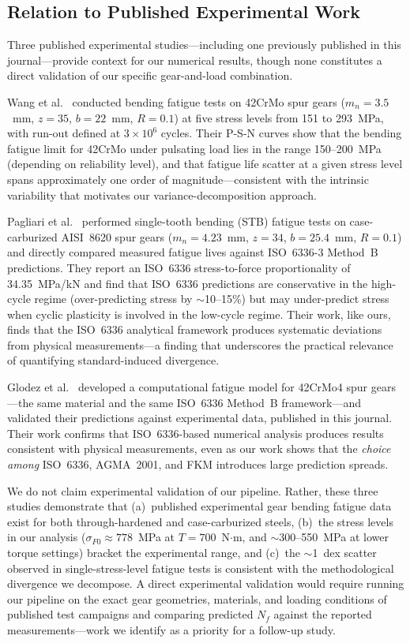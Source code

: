 \documentclass[12pt,a4paper]{article}
\begin{document}
\subsection{Relation to Published Experimental Work}

Three published experimental studies---including one previously
published in this journal---provide context for our numerical
results, though none constitutes a direct validation of our
specific gear-and-load combination.

Wang et al.~\cite{wang2023} conducted bending fatigue tests on 42CrMo
spur gears ($m_n{=}3.5$~mm, $z{=}35$, $b{=}22$~mm, $R{=}0.1$) at five
stress levels from 151 to 293~MPa, with run-out defined at $3\times10^6$
cycles. Their P-S-N curves show that the bending fatigue limit for
42CrMo under pulsating load lies in the range 150--200~MPa (depending on
reliability level), and that fatigue life scatter at a given stress level
spans approximately one order of magnitude---consistent with the
intrinsic variability that motivates our variance-decomposition approach.

Pagliari et al.~\cite{pagliari2025} performed single-tooth bending (STB)
fatigue tests on case-carburized AISI~8620 spur gears
($m_n{=}4.23$~mm, $z{=}34$, $b{=}25.4$~mm, $R{=}0.1$) and directly
compared measured fatigue lives against ISO~6336-3 Method~B predictions.
They report an ISO~6336 stress-to-force proportionality of
34.35~MPa/kN and find that ISO~6336 predictions are conservative in the
high-cycle regime (over-predicting stress by $\sim$10--15\%) but may
under-predict stress when cyclic plasticity is involved in the low-cycle
regime. Their work, like ours, finds that the ISO~6336 analytical
framework produces systematic deviations from physical measurements---a
finding that underscores the practical relevance of quantifying
standard-induced divergence.

Glodez et al.~\cite{glodez2002} developed a computational fatigue
model for 42CrMo4 spur gears---the same material and the same
ISO~6336 Method~B framework---and validated their predictions against
experimental data, published in this journal. Their work confirms that
ISO~6336-based numerical analysis produces results consistent with
physical measurements, even as our work shows that the \emph{choice
among} ISO~6336, AGMA~2001, and FKM introduces large prediction spreads.

We do not claim experimental validation of our pipeline. Rather, these
three studies demonstrate that (a)~published experimental gear bending
fatigue data exist for both through-hardened and case-carburized steels,
(b)~the stress levels in our analysis ($\sigma_{F0} \approx 778$~MPa
at $T{=}700$~N$\cdot$m, and $\sim$300--550~MPa at lower torque
settings) bracket the experimental range, and (c)~the $\sim$1~dex
scatter observed in single-stress-level fatigue tests is consistent
with the methodological divergence we decompose. A direct
experimental validation would require running our pipeline on the
exact gear geometries, materials, and loading conditions of published
test campaigns and comparing predicted $N_f$ against the reported
measurements---work we identify as a priority for a follow-up study.
\end{document}
